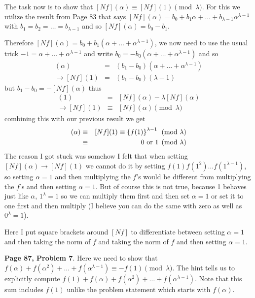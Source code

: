 \documentclass[aps,preprint,preprintnumbers,nofootinbib,showpacs,prd]{revtex4-1}
\newcommand{\nbea}{\begin{eqnarray*}}
\newcommand{\neea}{\end{eqnarray*}}
\begin{document}
The task now is to show that $[Nf](\alpha) \equiv [Nf](1) \pmod{\lambda}$. For this we utilize the result from Page 83 that says $[Nf](\alpha) = b_0 + b_1\alpha + \dots + b_{\lambda-1}\alpha^{\lambda-1}$ with $b_1 = b_2 = \dots = b_{\lambda-1}$ and so $[Nf](\alpha) = b_0 - b_1$.

Therefore $[Nf](\alpha) = b_0 + b_1(\alpha + \dots + \alpha^{\lambda-1})$, we now need to use the usual trick $-1 = \alpha + \dots + \alpha^{\lambda-1}$ and write $b_0 = -b_0(\alpha + \dots + \alpha^{\lambda-1})$ and so
%
\nbea
[Nf](\alpha) & = & (b_1 - b_0)(\alpha + \dots + \alpha^{\lambda-1}) \\
\to [Nf](1) & = & (b_1 - b_0)(\lambda - 1)
\neea
%
but $b_1 - b_0 = -[Nf](\alpha)$ thus
%
\nbea
[Nf](1) & = & [Nf](\alpha) - \lambda[Nf](\alpha) \\
\to [Nf](1) & \equiv & [Nf](\alpha) \pmod{\lambda}
\neea
%
combining this with our previous result we get
%
\nbea
[Nf](\alpha) & \equiv & [Nf](1) \equiv \left \{f(1)\right\}^{\lambda-1} \pmod{\lambda} \\
& \equiv & 0 {\rm ~or~} 1 \pmod{\lambda}
\neea
%
The reason I got stuck was somehow I felt that when setting $[Nf](\alpha) \to [Nf](1)$ we cannot do it by setting $f(1)f(1^2)\dots f(1^{\lambda-1})$, so setting $\alpha=1$ and then multiplying the $f$'s would be different from multiplying the $f$'s and then setting $\alpha = 1$. But of course this is not true, because 1 behaves just like $\alpha$, $1^\lambda = 1$ so we can multiply them first and then set $\alpha=1$ or set it to one first and then multiply (I believe you can do the same with zero as well as $0^{\lambda} = 1$).

Here I put square brackets around $[Nf]$ to differentiate between setting $\alpha=1$ and then taking the norm of $f$ and taking the norm of $f$ and then setting $\alpha=1$.

{\bf Page 87, Problem 7}. Here we need to show that $f(\alpha) + f(\alpha^2) + \dots + f(\alpha^{\lambda-1}) \equiv -f(1) \pmod{\lambda}$. The hint tells us to explicitly compute $f(1) + f(\alpha) + f(\alpha^2) + \dots + f(\alpha^{\lambda-1})$. Note that this sum includes $f(1)$ unlike the problem statement which starts with $f(\alpha)$.
\end{document}
